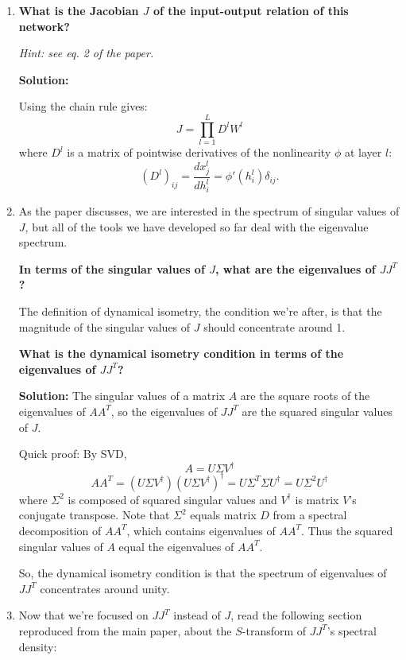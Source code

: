 \documentclass[a4paper]{article}
\begin{document}
\begin{enumerate}[label=(\alph*)]
\item \textbf{What is the Jacobian $J$ of the input-output relation of this network?}

\textit{Hint: see eq. 2 of the paper.}

\begin{tcolorbox}
\textbf{Solution:}

Using the chain rule gives:
$$ J = \prod_{l=1}^L D^l W^l$$
where $D^l$ is a matrix of pointwise derivatives of the nonlinearity $\phi$ at layer $l$:
\begin{equation}
    (D^l)_{ij} = \frac{dx^l_j}{dh^l_i} = \phi ' (h^l_i)\delta_{ij}.
\end{equation}
\end{tcolorbox}

\item As the paper discusses, we are interested in the spectrum of singular values of $J$, but all of the tools we have developed so far deal with the eigenvalue spectrum. 

\textbf{In terms of the singular values of $J$, what are the eigenvalues of $JJ^T$?}

The definition of dynamical isometry, the condition we're after, is that the magnitude of the singular values of $J$ should concentrate around 1. 

\textbf{What is the dynamical isometry condition in terms of the eigenvalues of $JJ^T$?}

\begin{tcolorbox}
\textbf{Solution:}
The singular values of a matrix $A$ are the square roots of the eigenvalues of $AA^T$, so the eigenvalues of $JJ^T$ are the squared singular values of $J$.  

Quick proof: By SVD, $$A=U \Sigma V^\dagger $$
$$AA^T = (U\Sigma V^\dagger)(U\Sigma V^\dagger)^\dagger = U \Sigma^T \Sigma U^\dagger = U \Sigma^2 U^\dagger $$ where $\Sigma^2$ is composed of squared singular values and $V^\dagger$ is matrix $V$'s conjugate transpose. Note that $\Sigma^2$ equals matrix $D$ from a spectral decomposition of $AA^T$, which contains eigenvalues of $AA^T$. Thus the squared singular values of $A$ equal the eigenvalues of $AA^T$. \qedsymbol

So, the dynamical isometry condition is that the spectrum of eigenvalues of $JJ^T$ concentrates around unity.


\end{tcolorbox}

\item Now that we're focused on $JJ^T$ instead of $J$, read the following section reproduced from the main paper, about the $S$-transform of $JJ^T$'s spectral density: 


\end{enumerate}
\end{document}
